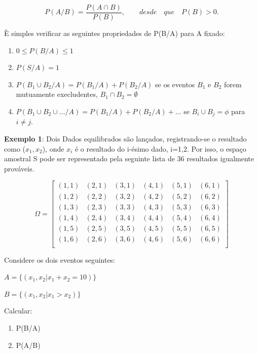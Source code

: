 \begin{equation}\label{}
    P(A/B) = \frac{P(A \cap B)}{P(B)}, \quad \quad desde \quad que
    \quad P(B)>0.
\end{equation}

È simples verificar as seguintes propriedades de P(B/A) para A
fixado:

\begin{enumerate}
    \item $0 \leq P(B/A) \leq 1$
    \item $P(S/A)=1$
     \item $P(B_{1} \cup B_{2}/A) = P(B_{1}/A)+P(B_{2}/A)$ se os
     eventos $B_{1}$ e $B_{2}$ forem mutuamente execludentes, $B_{1}\cap B_{2}=\emptyset$
     \item $P(B_{1} \cup B_{2} \cup ... / A) =
     P(B_{1}/A)+P(B_{2}/A)+...$ se $B_{i}\cup B_{j}=\phi$ para $i\neq
     j$.
\end{enumerate}



\textbf{Exemplo 1}: Dois Dados equilibrados são lançados,
registrando-se o resultado como ($x_{1},x_{2}$), onde $x_{i}$ é o
resultado do i-ésimo dado, i=1,2. Por isso, o espaço amostral S
pode ser representado pela seguinte lista de 36 resultados
igualmente prováveis.


$$
\Omega =
\left[%
\begin{array}{cccccc}
  (1,1) & (2,1) & (3,1) & (4,1) & (5,1) & (6,1) \\
  (1,2) & (2,2) & (3,2) & (4,2) & (5,2) & (6,2) \\
  (1,3) & (2,3) & (3,3) & (4,3) & (5,3) & (6,3) \\
  (1,4) & (2,4) & (3,4) & (4,4) & (5,4) & (6,4) \\
  (1,5) & (2,5) & (3,5) & (4,5) & (5,5) & (6,5) \\
  (1,6) & (2,6) & (3,6) & (4,6) & (5,6) & (6,6) \\
\end{array}%
\right]
$$

Considere os dois eventos seguintes:\vskip0.3cm

$A=\{(x_{1},x_{2}|x_{1}+x_{2}=10)\}$

$B=\{(x_{1},x_{2}|x_{1}>x_{2})\}$

\vskip0.3cm

Calcular:

\begin{enumerate}
    \item P(B/A)
    \item P(A/B)
\end{enumerate}


